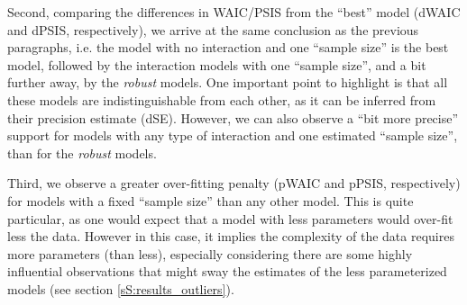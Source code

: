 Second, comparing the differences in WAIC/PSIS from the ``best'' model (dWAIC and dPSIS, respectively), we arrive at the same conclusion as the previous paragraphs, i.e. the model with no interaction and one ``sample size'' is the best model, followed by the interaction models with one ``sample size'', and a bit further away, by the \textit{robust} models. One important point to highlight is that all these models are indistinguishable from each other, as it can be inferred from their precision estimate (dSE). However, we can also observe a ``bit more precise'' support for models with any type of interaction and one estimated ``sample size'', than for the \textit{robust} models.

Third, we observe a greater over-fitting penalty (pWAIC and pPSIS, respectively) for models with a fixed ``sample size'' than any other model. This is quite particular, as one would expect that a model with less parameters would over-fit less the data. However in this case, it implies the complexity of the data requires more parameters (than less), especially considering there are some highly influential observations that might sway the estimates of the less parameterized models (see section \ref{sS:results_outliers}). 

